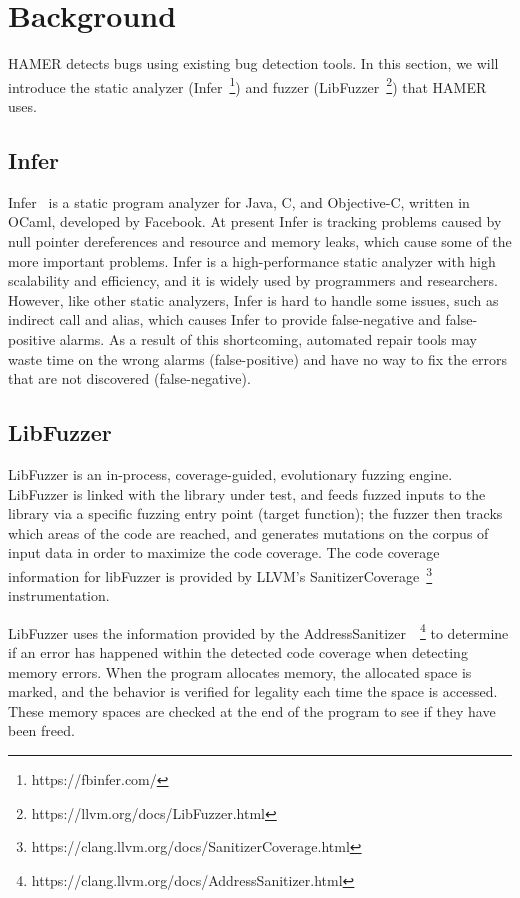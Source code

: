 \documentclass[a4paper,11pt,oneside,openany]{book}
\begin{document}

\chapter{Background}

HAMER detects bugs using existing bug detection tools. In this section, we will introduce the static analyzer (Infer~\footnote{https://fbinfer.com/}) and fuzzer (LibFuzzer~\footnote{https://llvm.org/docs/LibFuzzer.html}) that HAMER uses.

\section{Infer}

Infer~\cite{infer} is a static program analyzer for Java, C, and Objective-C, written in OCaml, developed by Facebook. At present Infer is tracking problems caused by null pointer dereferences and resource and memory leaks, which cause some of the more important problems. Infer is a high-performance static analyzer with high scalability and efficiency, and it is widely used by programmers and researchers. However, like other static analyzers, Infer is hard to handle some issues, such as indirect call and alias, which causes Infer to provide false-negative and false-positive alarms. As a result of this shortcoming, automated repair tools may waste time on the wrong alarms (false-positive) and have no way to fix the errors that are not discovered (false-negative).


\section{LibFuzzer}
LibFuzzer is an in-process, coverage-guided, evolutionary fuzzing engine. LibFuzzer is linked with the library under test, and feeds fuzzed inputs to the library via a specific fuzzing entry point (target function); the fuzzer then tracks which areas of the code are reached, and generates mutations on the corpus of input data in order to maximize the code coverage. The code coverage information for libFuzzer is provided by LLVM's SanitizerCoverage~\footnote{https://clang.llvm.org/docs/SanitizerCoverage.html} instrumentation.


LibFuzzer uses the information provided by the AddressSanitizer~\cite{asan}~\footnote{https://clang.llvm.org/docs/AddressSanitizer.html} to determine if an error has happened within the detected code coverage when detecting memory errors. When the program allocates memory, the allocated space is marked, and the behavior is verified for legality each time the space is accessed. These memory spaces are checked at the end of the program to see if they have been freed.
\end{document}
